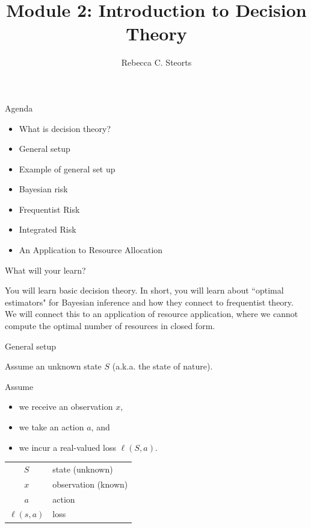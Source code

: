 \documentclass[
  ignorenonframetext,
]{beamer}
\title{Module 2: Introduction to Decision Theory}
\author{Rebecca C. Steorts}
\date{}
\providecommand{\tightlist}{%
  \setlength{\itemsep}{0pt}\setlength{\parskip}{0pt}}
\begin{document}
\frame{\titlepage}

\begin{frame}{Agenda}
\protect\hypertarget{agenda}{}

\begin{itemize}
\tightlist
\item
  What is decision theory?
\item
  General setup
\item
  Example of general set up
\item
  Bayesian risk
\item
  Frequentist Risk
\item
  Integrated Risk
\item
  An Application to Resource Allocation
\end{itemize}

\end{frame}

\begin{frame}{What will your learn?}
\protect\hypertarget{what-will-your-learn}{}

You will learn basic decision theory. In short, you will learn about
``optimal estimators" for Bayesian inference and how they connect to
frequentist theory. We will connect this to an application of resource
application, where we cannot compute the optimal number of resources in
closed form.

\end{frame}

\begin{frame}{General setup}
\protect\hypertarget{general-setup}{}

Assume an unknown state \(S\) (a.k.a. the state of nature).

Assume

\begin{itemize}
\tightlist
\item
  we receive an observation \(x\),
\item
  we take an action \(a\), and
\item
  we incur a real-valued loss \(\ell(S,a)\).
\end{itemize}

\begin{center}
\begin{tabular}{ c l }
$S$ & state (unknown) \\
$x$ & observation (known) \\
$a$ & action \\
$\ell(s,a)$ & loss
\end{tabular}
\end{center}

\end{frame}
\end{document}
